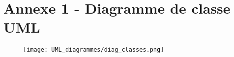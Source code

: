 \documentclass[11pt]{article}
\begin{document}




\appendix  %
\section*{Annexe 1 - Diagramme de classe UML}


\begin{figure}[H]
    \label{UML_classes}
    \centering
    \texttt{[image: UML\_diagrammes/diag\_classes.png]}
\end{figure}


\restoregeometry
\end{document}
